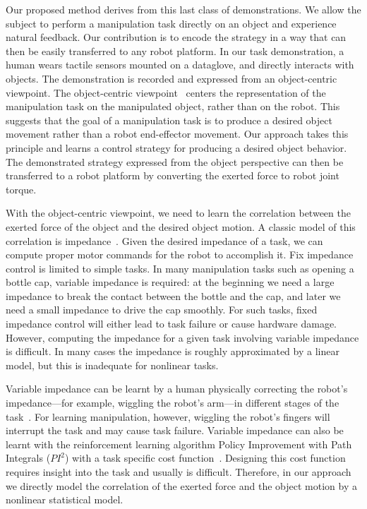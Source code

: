 Our proposed method derives from this last class of demonstrations.
We allow the subject to perform a manipulation task directly on an
object and experience natural feedback. Our contribution is to
encode the strategy in a way that can then be
easily transferred to any robot platform. In our task demonstration, a
human wears tactile sensors mounted on a dataglove, and directly
interacts with objects. The demonstration is recorded and expressed
from an object-centric viewpoint. The object-centric
viewpoint~\citep{okamura2000overview,jain2013improving,Miao2014}
centers the representation of the manipulation task on the manipulated
object, rather than on the robot.
This suggests that the goal of a manipulation task is to produce a desired
object movement rather than a robot end-effector movement. Our
approach takes this principle and learns a control strategy for
producing a desired object behavior. The demonstrated strategy
expressed from the object perspective can then be transferred to a
robot platform by converting %
the exerted force to robot joint torque.

With the object-centric viewpoint, we need to learn the correlation
between the exerted force of the object and the desired object
motion. A classic model of this correlation is
impedance~\citep{howard2010transferring,wimbock2012comparison}. Given
the desired impedance of a task, we can compute proper motor commands
for the robot to accomplish it. Fix impedance control is limited to
simple tasks. In many manipulation tasks such as opening a bottle cap,
variable impedance is required: at the beginning we need a large
impedance to break the contact between the bottle and the cap, and
later we need a small impedance to drive the cap smoothly. For such
tasks, fixed impedance control will either lead to task failure or cause
hardware damage.  However, computing the impedance for a given task
involving variable impedance is difficult.  In many cases the
impedance is roughly approximated by a linear model, but this is
inadequate for nonlinear tasks. %


Variable impedance can be learnt by a human physically correcting the
robot's impedance---for example, wiggling the robot's arm---in different stages of
the task~\citep{kronander2012online}. For learning manipulation,
however, wiggling the robot's fingers will interrupt the task and may
cause task failure.
Variable impedance can also be learnt with the reinforcement learning
algorithm Policy Improvement with Path Integrals ($PI^2$) with a task
specific cost function~\citep{buchli2011learning}. Designing this cost
function requires insight into the task and usually is
difficult. Therefore, in our approach we directly model the
correlation of the exerted force and the object motion by a nonlinear
statistical model.


